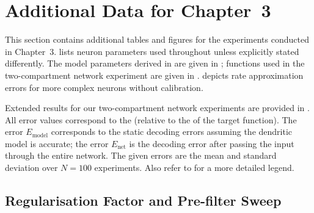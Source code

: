 
\section{Additional Data for Chapter~3}
\label{app:data_chp3}

This section contains additional tables and figures for the experiments conducted in Chapter~3.
 lists neuron parameters used throughout  unless explicitly stated differently.
The model parameters derived in  are given in ; functions used in the two-compartment \LIF network experiment are given in .
 depicts rate approximation errors for more complex \nlif neurons without calibration.







Extended results for our two-compartment \LIF network experiments are provided in .
All error values correspond to the \NRMSE (relative to the \RMS of the target function).
The error $E_\mathrm{model}$ corresponds to the static decoding errors assuming the dendritic model is accurate;
the error $E_\mathrm{net}$ is the decoding error after passing the input through the entire network.
The given errors are the mean and standard deviation over $N = 100$ experiments.
Also refer to  for a more detailed legend.



\subsection{Regularisation Factor and Pre-filter Sweep}
\label{app:two_comp_regularisation_factor_sweep}

